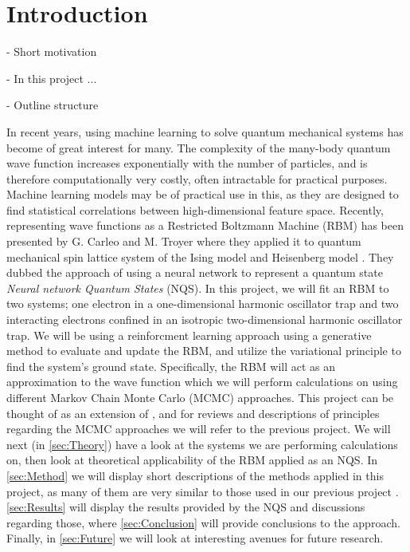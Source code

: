 \section{Introduction}\label{sec:Introduction}

- Short motivation

- In this project ... 

- Outline structure


In recent years, using machine learning to solve quantum mechanical systems has become of great interest for many. The complexity of the many-body quantum wave function increases exponentially with the number of particles, and is therefore computationally very costly, often intractable for practical purposes. Machine learning models may be of practical use in this, as they are designed to find statistical correlations between high-dimensional feature space. Recently, representing wave functions as a Restricted Boltzmann Machine (RBM) has been presented by G. Carleo and M. Troyer where they applied it to quantum mechanical spin lattice system of the Ising model and Heisenberg model \citep{Carleo_2017}. They dubbed the approach of using a neural network to represent a quantum state \textit{Neural network Quantum States} (NQS). In this project, we will fit an RBM to two systems; one electron in a one-dimensional harmonic oscillator trap and two interacting electrons confined in an isotropic two-dimensional harmonic oscillator trap. We will be using a reinforcment learning approach using a generative method to evaluate and update the RBM, and utilize the variational principle to find the system's ground state. Specifically, the RBM will act as an approximation to the wave function which we will perform calculations on using different Markov Chain Monte Carlo (MCMC) approaches.  %
This project can be thought of as an extension of \citep{project1}, and for reviews and descriptions of principles regarding the MCMC approaches we will refer to the previous project. 
We will next (in \autoref{sec:Theory}) have a look at the systems we are performing calculations on, then look at theoretical applicability of the RBM applied as an NQS. In \autoref{sec:Method} we will display short descriptions of the methods applied in this project, as many of them are very similar to those used in our previous project \citep{project1}. \autoref{sec:Results} will display the results provided by the NQS and discussions regarding those, where \autoref{sec:Conclusion} will provide conclusions to the approach. Finally, in \autoref{sec:Future} we will look at interesting avenues for future research. 

